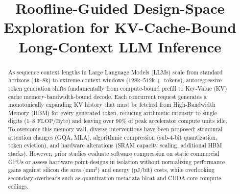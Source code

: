 \documentclass[conference,onecolumn]{IEEEtran}
\begin{document}
\title{Roofline-Guided Design-Space Exploration for KV-Cache-Bound Long-Context LLM Inference}

\author{
}

\maketitle

\begin{abstract}
As sequence context lengths in Large Language Models (LLMs) scale from standard horizons ($4\text{k}$--$8\text{k}$) to extreme context windows ($128\text{k}$--$512\text{k}+$ tokens), autoregressive token generation shifts fundamentally from compute-bound prefill to Key-Value (KV) cache memory-bandwidth-bound decode. Each concurrent request generates a monotonically expanding KV history that must be fetched from High-Bandwidth Memory (HBM) for every generated token, reducing arithmetic intensity to single digits ($1$--$8\text{ FLOP/Byte}$) and leaving over 90\% of peak accelerator compute units idle. To overcome this memory wall, diverse interventions have been proposed: structural attention changes (GQA, MLA), algorithmic compression (sub-4-bit quantization, token eviction), and hardware alterations (SRAM capacity scaling, additional HBM stacks). However, prior studies evaluate software compression on static commercial GPUs or assess hardware point-designs in isolation without normalizing performance gains against silicon die area ($\text{mm}^2$) and energy ($\text{pJ/bit}$) costs, while overlooking secondary overheads such as quantization metadata bloat and CUDA-core compute ceilings.


\end{abstract}
\end{document}
